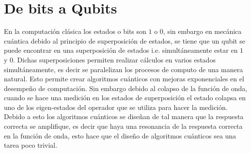 \documentclass[a4paper]{article}
\begin{document}
\section{De bits a Qubits}
En la computación clásica los estados o bits son $1$ o $0$, sin embargo en mecánica cuántica debido al principio de superposición de estados, se tiene que un qubit se puede encontrar en una superposición de estados i.e. simultáneamente estar en $1$ y $0$. Dichas superposiciones permiten realizar cálculos en varios estados simultáneamente, es decir se paralelizan los procesos de computo de una manera natural. Esto permite crear algoritmos cuánticos con mejoras exponenciales en el desempeño de computación. Sin embargo debido al colapso de la función de onda, cuando se hace una medición en los estados de superposición el estado colapsa en uno de los eigen-estados del operador que se utiliza para hacer la medición. \\
Debido a esto los algoritmos cuánticos se diseñan de tal manera que la respuesta correcta se amplifique, es decir que haya una resonancia de la respuesta correcta en la función de onda, esto hace que el diseño de algoritmos cuánticos sea una tarea poco trivial.
\end{document}
